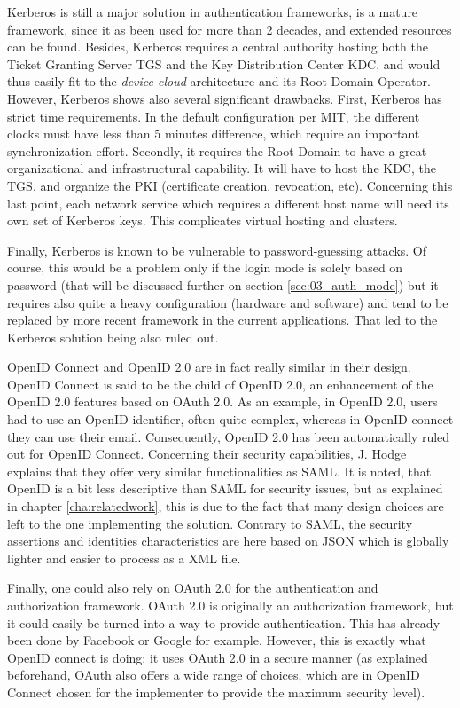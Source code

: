 Kerberos is still a major solution in authentication frameworks, is a mature framework, since it as been used for more than 2 decades, and extended resources can be found. Besides, Kerberos requires a central authority hosting both the Ticket Granting Server TGS and the Key Distribution Center KDC, and would thus easily fit to the \emph{device cloud} architecture and its Root Domain Operator. However, Kerberos shows also several significant drawbacks. First, Kerberos has strict time requirements. In the default configuration per MIT, the different clocks must have less than 5 minutes difference, which require an important synchronization effort. Secondly, it requires the Root Domain to have a great organizational and infrastructural capability. It will have to host the KDC, the TGS, and organize the PKI (certificate creation, revocation, etc). Concerning this last point, each network service which requires a different host name will need its own set of Kerberos keys. This complicates virtual hosting and clusters.

Finally, Kerberos is known to be vulnerable to password-guessing attacks. Of course, this would be a problem only if the login mode is solely based on password (that will be discussed further on section \ref{sec:03_auth_mode}) but it requires also quite a heavy configuration (hardware and software) and tend to be replaced by more recent framework in the current applications. That led to the Kerberos solution being also ruled out.

OpenID Connect and OpenID 2.0 are in fact really similar in their design. OpenID Connect is said to be the child of OpenID 2.0, an enhancement of the OpenID 2.0 features based on OAuth 2.0. As an example, in OpenID 2.0, users had to use an OpenID identifier, often quite complex, whereas in OpenID connect they can use their email. Consequently, OpenID 2.0 has been automatically ruled out for OpenID Connect. Concerning their security capabilities, J. Hodge explains that they offer very similar functionalities as SAML\cite{Hodge2008}. It is noted, that OpenID is a bit less descriptive than SAML for security issues, but as explained in chapter \ref{cha:relatedwork}, this is due to the fact that many design choices are left to the one implementing the solution. Contrary to SAML, the security assertions and identities characteristics are here based on JSON which is globally lighter and easier to process as a XML file.

Finally, one could also rely on OAuth 2.0 for the authentication and authorization framework. OAuth 2.0 is originally an authorization framework, but it could easily be turned into a way to provide authentication. This has already been done by Facebook or Google for example. However, this is exactly what OpenID connect is doing: it uses OAuth 2.0 in a secure manner (as explained beforehand, OAuth also offers a wide range of choices, which are in OpenID Connect chosen for the implementer to provide the maximum security level).

